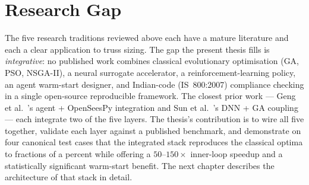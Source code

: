 \section{Research Gap}
\label{sec:lit:gap}

The five research traditions reviewed above each have a mature
literature and each a clear application to truss sizing. The gap
the present thesis fills is \emph{integrative}: no published work
combines classical evolutionary optimisation (GA, PSO, NSGA-II), a
neural surrogate accelerator, a reinforcement-learning policy, an
agent warm-start designer, and Indian-code (IS~800:2007) compliance
checking in a single open-source reproducible framework. The
closest prior work --- Geng et al.~\cite{geng2024}'s agent +
OpenSeesPy integration and Sun et al.~\cite{sun2023}'s DNN + GA
coupling --- each integrate two of the five layers. The thesis's
contribution is to wire all five together, validate each layer
against a published benchmark, and demonstrate on four canonical
test cases that the integrated stack reproduces the classical
optima to fractions of a percent while offering a
$\num{50}$--$\num{150}\times$ inner-loop speedup and a
statistically significant warm-start benefit. The next chapter
describes the architecture of that stack in detail.
